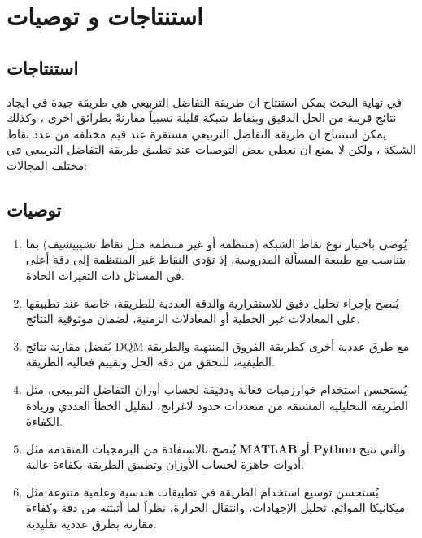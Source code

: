 \chapter*{استنتاجات و توصيات}
\section*{استنتاجات}
\noindent
في نهاية البحث يمكن استنتاج ان طريقة التفاضل التربيعي هي طريقة جيدة في ايجاد نتائج قريبة من الحل الدقيق وبنقاط شبكة قليلة نسبياً مقارنةً بطرائق اخرى ، وكذلك يمكن استنتاج ان طريقة التفاضل التربيعي مستقرة عند قيم مختلفة من عدد نقاط الشبكة ، ولكن لا يمنع ان نعطي بعض التوصيات عند تطبيق طريقة التفاضل التربيعي في مختلف المجالات:
\section*{توصيات}

\begin{enumerate}
	\item يُوصى باختيار نوع نقاط الشبكة (منتظمة أو غير منتظمة مثل نقاط تشيبيشيف) بما يتناسب مع طبيعة المسألة المدروسة، إذ تؤدي النقاط غير المنتظمة إلى دقة أعلى في المسائل ذات التغيرات الحادة.
	
	\item يُنصح بإجراء تحليل دقيق للاستقرارية والدقة العددية للطريقة، خاصة عند تطبيقها على المعادلات غير الخطية أو المعادلات الزمنية، لضمان موثوقية النتائج.
	
	\item يُفضل مقارنة نتائج DQM مع طرق عددية أخرى كطريقة الفروق المنتهية والطريقة الطيفية، للتحقق من دقة الحل وتقييم فعالية الطريقة.
	
	\item يُستحسن استخدام خوارزميات فعالة ودقيقة لحساب أوزان التفاضل التربيعي، مثل الطريقة التحليلية المشتقة من متعددات حدود لاغرانج، لتقليل الخطأ العددي وزيادة الكفاءة.

	
	\item يُنصح بالاستفادة من البرمجيات المتقدمة مثل \textbf{MATLAB} أو \textbf{Python} والتي تتيح أدوات جاهزة لحساب الأوزان وتطبيق الطريقة بكفاءة عالية.
	
	\item يُستحسن توسيع استخدام الطريقة في تطبيقات هندسية وعلمية متنوعة مثل ميكانيكا الموائع، تحليل الإجهادات، وانتقال الحرارة، نظراً لما أثبتته من دقة وكفاءة مقارنة بطرق عددية تقليدية.
\end{enumerate}
